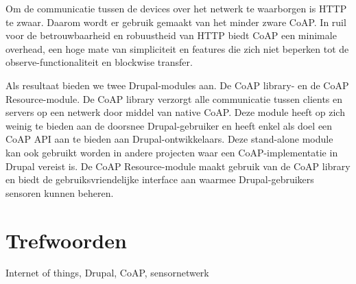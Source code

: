{Om de communicatie tussen de devices over het netwerk te waarborgen is HTTP te zwaar. Daarom wordt er gebruik gemaakt van het minder zware CoAP. In ruil voor de betrouwbaarheid en robuustheid van HTTP biedt CoAP een minimale overhead, een hoge mate van simpliciteit en features die zich niet beperken tot de observe-functionaliteit en blockwise transfer.

Als resultaat bieden we twee Drupal-modules aan. De CoAP library- en de CoAP Resource-module. De CoAP library verzorgt alle communicatie tussen clients en servers op een netwerk door middel van native CoAP. Deze module heeft op zich weinig te bieden aan de doorsnee Drupal-gebruiker en heeft enkel als doel een CoAP API aan te bieden aan Drupal-ontwikkelaars. Deze stand-alone module kan ook gebruikt worden in andere projecten waar een CoAP-implementatie in Drupal vereist is. De CoAP Resource-module maakt gebruik van de CoAP library en biedt de gebruiksvriendelijke interface aan waarmee Drupal-gebruikers sensoren kunnen beheren.




\section*{Trefwoorden}


Internet of things, Drupal, CoAP, sensornetwerk

}

\newpage %
